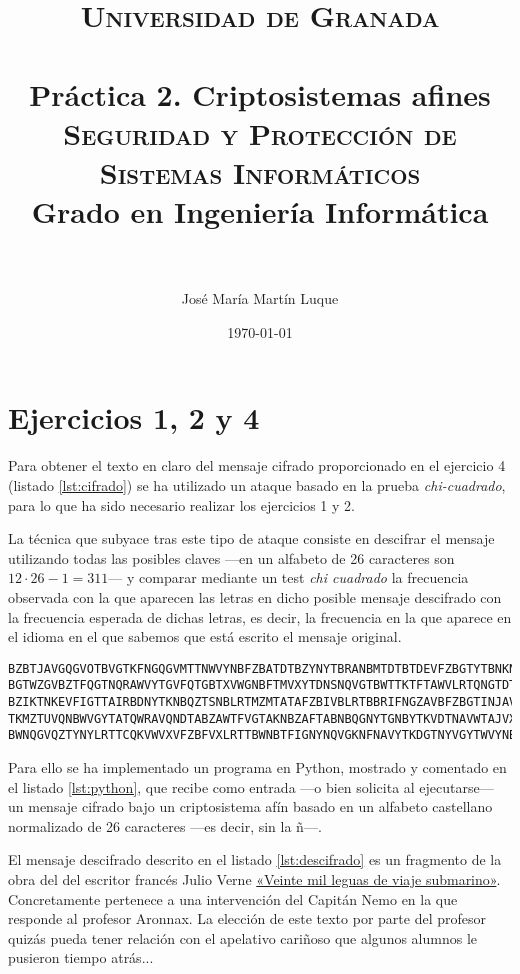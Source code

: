 \documentclass[
  a4paper,
  spanish,
  12pt,
]{scrartcl}
\title{	
\normalfont \normalsize 
\textsc{Universidad de Granada}\\ [25pt] %
\horrule{0.5pt} \\[0.4cm] %
{\sffamily\bfseries\Large Práctica 2. Criptosistemas afines} \\[6pt] %
\textsf{\textsc{Seguridad y Protección de Sistemas Informáticos} \\Grado en Ingeniería Informática}\\
\horrule{2pt} \\ %
}
\author{José María Martín Luque} %
\date{\normalsize\today} %
\begin{document}
\maketitle %

\section*{Ejercicios 1, 2 y 4}

Para obtener el texto en claro del mensaje cifrado proporcionado en el ejercicio 4 (listado  \ref{lst:cifrado}) se ha utilizado un ataque basado en la prueba \textit{chi-cuadrado}, para lo que ha sido necesario realizar los ejercicios 1 y 2. 

La técnica que subyace tras este tipo de ataque consiste en descifrar el mensaje utilizando todas las posibles claves —en un alfabeto de 26 caracteres son $12\cdot 26 - 1 = 311$— y comparar mediante un test \textit{chi cuadrado} la frecuencia observada con la que aparecen las letras en dicho posible mensaje descifrado con la frecuencia esperada de dichas letras, es decir, la frecuencia en la que aparece en el idioma en el que sabemos que está escrito el mensaje original.

\begin{lstlisting}[caption={Mensaje cifrado}, label={lst:cifrado}, breaklines=true]
BZBTJAVGQGVOTBVGTKFNGQGVMTTNWVYNBFZBATDTBZYNYTBRANBMTDTBTDEVFZBGTYTBNKNGNBWGNXKN
BGTWZGVBZTFQGTNQRAWVYTGVFQTGBTXVWGNBFTMVXYTDNSNQVGTBWTTKTFTAWVLRTQNGTDTBTGZANDDT
BZIKTNKEVFIGTTAIRBDNYTKNBQZTSNBLRTMZMTATAFZBIVBLRTBBRIFNGZAVBFZBGTINJAVBDVFVKVBY
TKMZTUVQNBWVGYTATQWRAVQNDTABZAWTFVGTAKNBZAFTABNBQGNYTGNBYTKVDTNAVWTAJVXVNEZRANMN
BWNQGVQZTYNYLRTTCQKVWVXVFZBFVXLRTTBWNBTFIGNYNQVGKNFNAVYTKDGTNYVGYTWVYNBKNBDVBNB
\end{lstlisting}

Para ello se ha implementado un programa en Python, mostrado y comentado en el listado \ref{lst:python}, que recibe como entrada —o bien solicita al ejecutarse— un mensaje cifrado bajo un criptosistema afín basado en un alfabeto castellano normalizado de 26 caracteres —es decir, sin la ñ—. 

El mensaje descifrado descrito en el listado \ref{lst:descifrado} es un fragmento de la obra del del escritor francés Julio Verne \href{https://es.wikisource.org/wiki/Veinte_mil_leguas_de_viaje_submarino:_Primera_parte:_Cap%C3%ADtulo_X}{«Veinte mil leguas de viaje submarino»}. Concretamente pertenece a una intervención del Capitán Nemo en la que responde al profesor Aronnax. La elección de este texto por parte del profesor quizás pueda tener relación con el apelativo cariñoso que algunos alumnos le pusieron tiempo atrás...
\end{document}
